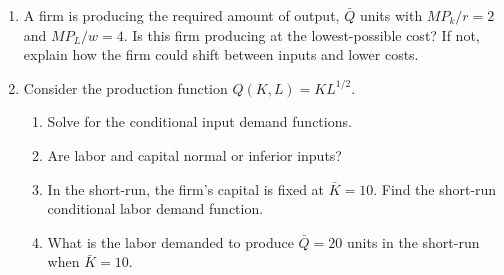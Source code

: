 \documentclass[11pt]{article}
\newcommand{\answer}[1]{\iftoggle{INCLUDEANSWERS}{{\color{violet!70!white}\textbf{Solution:} #1}}{}}
\begin{document}
\begin{enumerate}
  \item A firm is producing the required amount of output, $\bar{Q}$ units with $MP_k / r = 2$ and $MP_L / w = 4$. Is this firm producing at the lowest-possible cost? If not, explain how the firm could shift between inputs and lower costs.
    
  \item Consider the production function $Q(K, L) = KL^{1/2}$.
  \begin{enumerate}
    \item Solve for the conditional input demand functions. 
    
    \item Are labor and capital normal or inferior inputs?
    
    \item In the short-run, the firm's capital is fixed at $\bar{K} = 10$. Find the short-run conditional labor demand function. 
    
    \item What is the labor demanded to produce $\bar{Q} = 20$ units in the short-run when $\bar{K} = 10$.
  \end{enumerate} 

  \answer{
    \begin{enumerate}
      \item The optimality condtion is given by
      $$
        \frac{L^{1/2}}{r} = \frac{1/2L^{-1/2}K}{w} \implies K = 2 \frac{w}{r} L
      $$

      Plugging that into the production constraint gives
      $$
        \bar{Q} = 2 \frac{w}{r} L^{3/2} \implies L^*(\bar{Q}, w, r) = \big(\frac{\bar{Q} r}{2w} \big)^{2/3}
      $$
      Likewise, $K^*(\bar{Q}, w, r) = 2 \frac{w}{r} \big(\frac{\bar{Q} r}{2w} \big)^{2/3}$

      \item They are normal inputs since $\partial L^* / \partial \bar{Q} > 0$ and $\partial K^* / \partial \bar{Q} > 0$.
      
      \item $\bar{Q} = 10 L^{1/2} \implies L^*(\bar{Q}) = \frac{\bar{Q}^2}{100}$
      
      \item $L^*(10) = \frac{10^2}{100} = 1$
    \end{enumerate}
  }
\end{enumerate}
\end{document}
